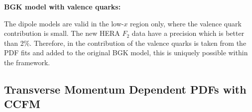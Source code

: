 \begin{description}
\vspace{0.1cm}
\item \bf {BGK model with valence quarks:} \rm

The dipole models are valid in the low-$x$ region only, where the valence quark contribution is small.
The new HERA $F_2$ data have a precision which is  better than 2$\%$. Therefore, in \fitter the contribution of the valence quarks is taken from the PDF fits and added to the original 
BGK model, this is uniquely possible within the \fitter framework.
\end{description}

\subsection{Transverse Momentum Dependent  PDFs with CCFM}


